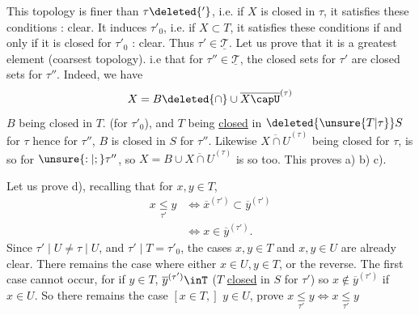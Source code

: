 This topology is finer than $\tau\deleted{'}$, i.e. if $X$ is closed in $\tau$, it satisfies these conditions : clear. It induces $\tau'_0$, i.e. if $X\subset T$, it satisfies these conditions if and only if it is closed for $\tau'_0$ : clear. Thus $\tau'\in\underline{\mathscr{T}}$. Let us prove that it is a greatest element (coarsest topology). i.e that for  $\tau''\in\underline{\mathscr{T}}$, the closed sets for $\tau'$ are closed sets for $\tau''$. Indeed, we have
\[
X=B\deleted{\cap}\cup\overline{X\capU}^{(\tau)}
\]
$B$ being closed in $T$. (for $\tau'_0$), and $T$ being \uline{closed} in $\deleted{\unsure{T|\tau}}S$ for $\tau$ hence  for $\tau''$, $B$ is closed in $S$ for $\tau''$.
Likewise $\overline{X\cap U}^{(\tau)}$ being closed for $\tau$, is so for $\unsure{:|;}\tau''$, so $X=B\cup\overline{X\cap U}^{(\tau)}$ is so too. This proves a) b) c).

Let us prove d), recalling that for $x,y\in T$,
\[
\begin{aligned}
x\underset{\tau'}{\leq}y&\Longleftrightarrow\overline{x}^{(\tau')}\subset\overline{y}^{(\tau')}\\
&\Longleftrightarrow x\in\overline{y}^{(\tau')}.
\end{aligned}
\]
Since $\tau'\mid U\ne\tau\mid U$, and $\tau'\mid T=\tau'_0$, the cases $x,y\in T$ and $x,y\in U$ are already clear. There remains the case where either $x\in U,y\in T$, or the reverse. The first case cannot occur, for if $y\in T$, $\overline{y}^{(\tau')}\inT$ ($T$ \uline{closed} in $S$ for $\tau'$) so $x\notin\overline{y}^{(\tau')}$  if $x\in U$. So there remains the case $[x\in T,]$ $y\in U$, prove $x\underset{\tau'}{\leq}y\Longleftrightarrow x\underset{\tau'}{\leq}y$
